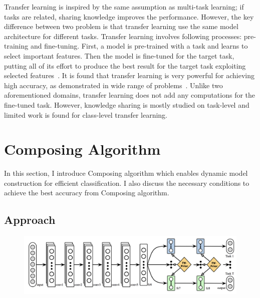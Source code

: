 \documentclass{article}
\begin{document}
Transfer learning is inspired by the same assumption as multi-task learning; if tasks are related, sharing knowledge improves the performance. However, the key difference between two problem is that transfer learning use the same model architecture for different tasks. Transfer learning involves following processes: pre-training and fine-tuning. First, a model is pre-trained with a task and learns to select important features. Then the model is fine-tuned for the target task, putting all of its effort to produce the best result for the target task exploiting selected features~\cite{yosinski2014transferable}. It is found that transfer learning is very powerful for achieving high accuracy, as demonstrated in wide range of problems~\cite{raina2007self, egan2004effects, glorot2011domain}. Unlike two aforementioned domains, transfer learning does not add any computations for the fine-tuned task. However, knowledge sharing is mostly studied on task-level and limited work is found for class-level transfer learning.

\section{Composing Algorithm}

In this section, I introduce Composing algorithm which enables dynamic model construction for efficient classification. I also discuss the necessary conditions to achieve the best accuracy from Composing algorithm.

\subsection{Approach}

\begin{figure}[t!]
  \centering
  \includegraphics[scale=0.32,trim={0mm 0mm 0mm 0mm},clip]{long2017learning.png}
\end{figure}
\end{document}
